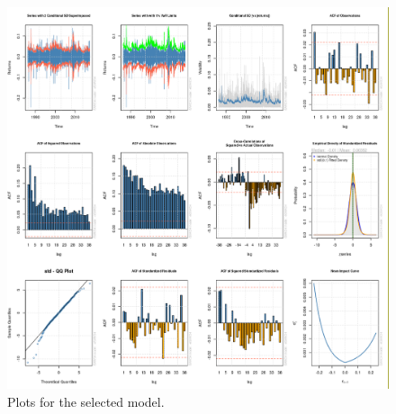 \documentclass{article}
\begin{document}
\begin{figure}[h]
	\centering
	\includegraphics[width=\linewidth]{garch}
	\caption{Plots for the selected model.}
	\label{fig:garch}
\end{figure}
\end{document}
